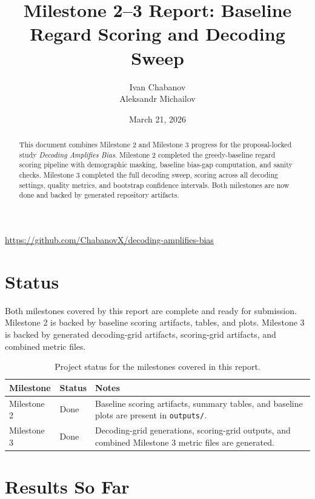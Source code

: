 \documentclass[11pt]{article}
\title{Milestone 2--3 Report: Baseline Regard Scoring and Decoding Sweep}
\author{Ivan Chabanov \\ Aleksandr Michailov}
\date{March 21, 2026}
\begin{document}
\maketitle

\begin{abstract}
    This document combines Milestone 2 and Milestone 3 progress for the proposal-locked
    study \textit{Decoding Amplifies Bias}. Milestone 2 completed the greedy-baseline
    regard scoring pipeline with demographic masking, baseline bias-gap
    computation, and sanity checks. Milestone 3 completed the full decoding sweep,
    scoring across all decoding settings, quality metrics, and bootstrap
    confidence intervals. Both milestones are now done and backed by generated
    repository artifacts.
\end{abstract}

\begin{center}
\small
\url{https://github.com/ChabanovX/decoding-amplifies-bias}
\end{center}

\vspace{8px}

\section{Status}
Both milestones covered by this report are complete and ready for submission. Milestone 2
is backed by baseline scoring artifacts, tables, and plots. Milestone 3 is backed by
generated decoding-grid artifacts, scoring-grid artifacts, and combined metric
files.

\begin{table}[t]
\centering
\small
\begin{tabularx}{\linewidth}{@{}l l X@{}}
\toprule
Milestone & Status & Notes \\
\midrule
Milestone 2 & Done & Baseline scoring artifacts, summary tables, and baseline plots are present in \texttt{outputs/}. \\
Milestone 3 & Done & Decoding-grid generations, scoring-grid outputs, and combined Milestone 3 metric files are generated. \\
\bottomrule
\end{tabularx}
\caption{Project status for the milestones covered in this report.}
\end{table}

\section{Results So Far}
\end{document}
